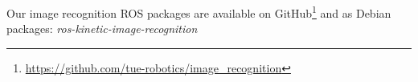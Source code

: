 Our image recognition ROS packages are available on GitHub\footnote{\url{https://github.com/tue-robotics/image_recognition}} and as Debian packages: \emph{ros-kinetic-image-recognition}
